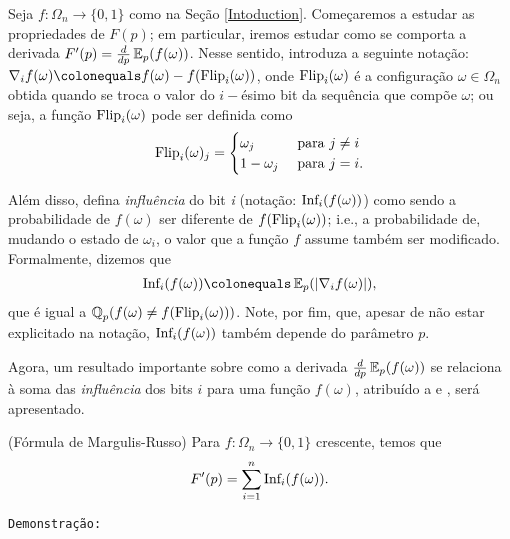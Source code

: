 \par Seja $f: \Omega_n \longrightarrow \{0,1\}$ como na Seção \ref{Intoduction}. Começaremos a estudar as propriedades de $F(p)$; em particular, iremos estudar como se comporta a derivada $F'(p) = \frac{d}{dp}\operatorname{\mathbb{E}}_p(f(\omega))$. Nesse sentido, introduza a seguinte notação: $\diff \colonequals f(\omega) - f(\flip)$, onde $\text{Flip}_i(\omega)$ é a configuração $\omega \in \Omega_n$ obtida quando se troca o valor do $i-$ésimo bit da sequência que compõe $\omega$; ou seja, a função $\text{Flip}_i(\omega)$ pode ser definida como
\[ \text{Flip}_i(\omega)_j = \begin{cases}
	\omega_j   & \text{ para } j \neq i \\
	1 - \omega_j & \text{ para } j = i.
\end{cases}
\]

\par Além disso, defina \textit{influência} do bit \textit{i} (notação: $\text{Inf}_i(f(\omega))$) como sendo a probabilidade de $f(\omega)$ ser diferente de $f(\text{Flip}_i(\omega))$; i.e., a probabilidade de, mudando o estado de $\omega_i$, o valor que a função $f$ assume também ser modificado. Formalmente, dizemos que
\begin{align*}
	\infl \colonequals \EX_p(|\diff|),  
\end{align*}
que é igual a $\operatorname{\mathbb{Q}}_p(f(\omega) \neq f(\text{Flip}_i(\omega)))$. Note, por fim, que, apesar de não estar explicitado na notação, $\text{Inf}_i(f(\omega))$ também depende do parâmetro $p$. 

\par Agora, um resultado importante sobre como a derivada $\frac{d}{dp}\operatorname{\mathbb{E}}_p(f(\omega))$ se relaciona à soma das \textit{influência} dos bits $i$ para uma função $f(\omega)$, atribuído a \cite{margulis1974probabilistic} e \cite{russo1981critical}, será apresentado. 

\begin{mythm}(Fórmula de Margulis-Russo)\label{formula-margulis-russo}
	Para $f: \Omega_n \longrightarrow \{0, 1\}$ crescente, temos que
	\begin{align*}
		F'(p) = \sum_{i = 1}^{n} \text{Inf}_i(f(\omega)).
	\end{align*}
\end{mythm}

\par \texttt{Demonstração:}

